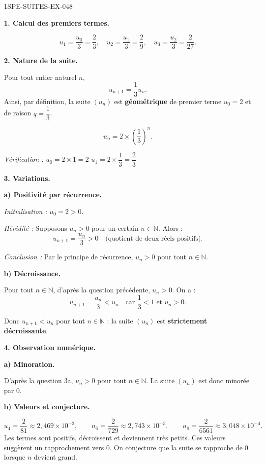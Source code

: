 \begin{corrige}{1SPE-SUITES-EX-048}

\textbf{1. Calcul des premiers termes.}

\[
u_1 = \frac{u_0}{3} = \frac{2}{3}, \quad u_2 = \frac{u_1}{3} = \frac{2}{9}, \quad u_3 = \frac{u_2}{3} = \frac{2}{27}.
\]

\textbf{2. Nature de la suite.}

Pour tout entier naturel $n$,
\[
u_{n+1} = \frac{1}{3}u_n.
\]
Ainsi, par définition, la suite $(u_n)$ est \textbf{géométrique} de premier terme $u_0 = 2$ et de raison $q = \dfrac{1}{3}$.

\[
\boxed{u_n = 2 \times \left(\frac{1}{3}\right)^n.}
\]

\textit{Vérification :} $u_0 = 2 \times 1 = 2$ \checkmark \quad $u_1 = 2 \times \dfrac{1}{3} = \dfrac{2}{3}$ \checkmark

\textbf{3. Variations.}

\textbf{a) Positivité par récurrence.}

\textit{Initialisation :} $u_0 = 2 > 0$. \checkmark

\textit{Hérédité :} Supposons $u_n > 0$ pour un certain $n \in \mathbb{N}$. Alors :
\[
u_{n+1} = \frac{u_n}{3} > 0 \quad \text{(quotient de deux réels positifs).}
\]
\checkmark

\textit{Conclusion :} Par le principe de récurrence, $u_n > 0$ pour tout $n \in \mathbb{N}$.

\textbf{b) Décroissance.}

Pour tout $n \in \mathbb{N}$, d'après la question précédente, $u_n > 0$. On a :
\[
u_{n+1} = \frac{u_n}{3} < u_n \quad \text{car } \frac{1}{3} < 1 \text{ et } u_n > 0.
\]

Donc $u_{n+1} < u_n$ pour tout $n \in \mathbb{N}$ : la suite $(u_n)$ est \textbf{strictement décroissante}.

\textbf{4. Observation numérique.}

\textbf{a) Minoration.}

D'après la question 3a, $u_n > 0$ pour tout $n \in \mathbb{N}$. La suite $(u_n)$ est donc minorée par $0$.

\textbf{b) Valeurs et conjecture.}

\[
u_4=\frac{2}{81}\approx 2{,}469\times 10^{-2},\qquad
u_6=\frac{2}{729}\approx 2{,}743\times 10^{-3},\qquad
u_8=\frac{2}{6561}\approx 3{,}048\times 10^{-4}.
\]
Les termes sont positifs, décroissent et deviennent très petits. Ces valeurs suggèrent un rapprochement vers $0$. On conjecture que la suite se rapproche de $0$ lorsque $n$ devient grand.


\end{corrige}
